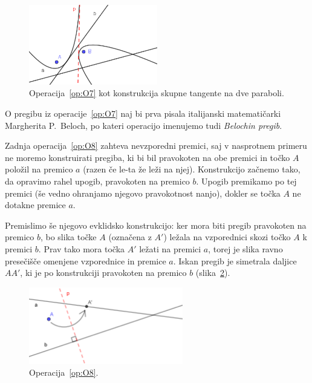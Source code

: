 \begin{figure}[h]
    \centering
    \includegraphics[width=0.5\textwidth]{images/origami_operacije/O7c_paraboli.png}
    \caption[Skupna tangenta na dve paraboli]{Operacija~\ref{op:O7} kot konstrukcija skupne tangente na dve paraboli.}
    \label{fig:O7_paraboli}
\end{figure}

\begin{opomba}
    O pregibu iz operacije~\ref{op:O7} naj bi prva pisala italijanski matematičarki Margherita P.\ Beloch, po kateri operacijo imenujemo tudi \emph{Belochin pregib}.
\end{opomba}

Zadnja operacija~\ref{op:O8} zahteva nevzporedni premici, saj v nasprotnem primeru ne moremo konstruirati pregiba, ki bi bil pravokoten na obe premici in točko $A$ položil na premico $a$ (razen če le-ta že leži na njej). Konstrukcijo začnemo tako, da opravimo rahel upogib, pravokoten na premico $b$. Upogib premikamo po tej premici (še vedno ohranjamo njegovo pravokotnost nanjo), dokler se točka $A$ ne dotakne premice $a$.

Premislimo še njegovo evklidsko konstrukcijo: ker mora biti pregib pravokoten na premico $b$, bo slika točke $A$ (označena z $A'$) ležala na vzporednici skozi točko $A$ k premici $b$. Prav tako mora točka $A'$ ležati na premici $a$, torej je slika ravno presečišče omenjene vzporednice in premice $a$. Iskan pregib je simetrala daljice $AA'$, ki je po konstrukciji pravokoten na premico $b$ (slika~\ref{fig:O8}).

\begin{figure}[h]
    \centering
    \includegraphics[width=0.6\textwidth]{images/origami_operacije/O8.png}
    \caption[Operacija~\ref{op:O8}]{Operacija~\ref{op:O8}.}
    \label{fig:O8}
\end{figure}

